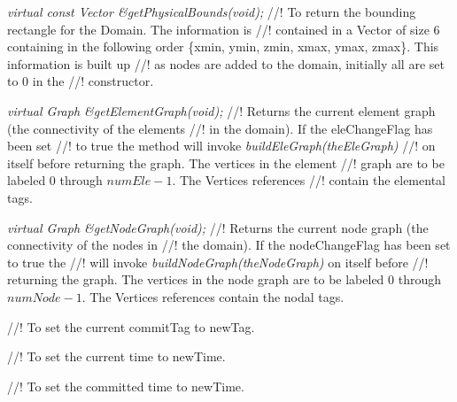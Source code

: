 {\em virtual const Vector \&getPhysicalBounds(void);} 
//! To return the bounding rectangle for the Domain. The information is
//! contained in a Vector of size 6 containing in the following order
\{xmin, ymin, zmin, xmax, ymax, zmax\}. This information is built up
//! as nodes are added to the domain, initially all are set to $0$ in the
//! constructor. 

{\em virtual Graph \&getElementGraph(void);} 
//! Returns the current element graph (the connectivity of the elements
//! in the domain). If the \p eleChangeFlag has been set
//! to \p true the method will invoke {\em buildEleGraph(theEleGraph)}
//! on itself before returning the graph. The vertices in the element
//! graph are to be labeled $0$ through $numEle-1$. The Vertices references
//! contain the elemental tags.  

{\em virtual Graph \&getNodeGraph(void);} 
//! Returns the current node graph (the connectivity of the nodes in
//! the domain). If the \p nodeChangeFlag has been set to \p true the
//! will invoke {\em buildNodeGraph(theNodeGraph)} on itself before
//! returning the graph. The vertices in the node graph are to be labeled
$0$ through $numNode-1$. The Vertices references contain the nodal tags.  


//! To set the current commitTag to \p newTag. 

//! To set the current time to \p newTime. 

//! To set the committed time to \p newTime. 

